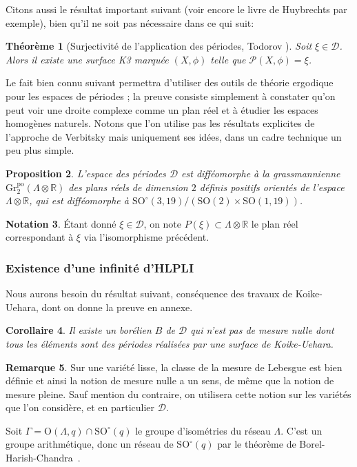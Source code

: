 \documentclass[JEP,XML,SOM,Unicode,francais,published]{cedram}
\newcommand{\R}{\mathbb{R}}
\newcommand{\rO}{\mathrm{O}}
\newcommand{\SO}{\mathrm{SO}}
\newtheorem{thm}{Théorème}
\newtheorem{coro}[thm]{Corollaire}
\newtheorem{prop}[thm]{Proposition}
\theoremstyle{definition}
\newtheorem{rem}[thm]{Remarque}
\newtheorem{notation}[thm]{Notation}
\begin{document}
Citons aussi le résultat important suivant (voir encore le livre de Huybrechts \hbox{\cite[chap.\,7]{huybrechts_2016}} par exemple), bien qu'il ne soit pas nécessaire dans ce qui suit:
\begin{thm}[Surjectivité de l'application des périodes, Todorov \cite{todorov}]\label{surjectivite-periode}
Soit $\xi \in \mathscr{D}$. Alors il existe une surface K3 marquée $(X, \phi)$ telle que $\mathscr{P}(X, \phi) = \xi$.
\end{thm}
Le fait bien connu suivant permettra d'utiliser des outils de théorie ergodique pour les espaces de périodes ; la preuve consiste simplement à constater qu'on peut voir une droite complexe comme un plan réel et à étudier les espaces homogènes naturels. Notons que l'on utilise pas les résultats explicites de l'approche de Verbitsky \cite{verbitsky2015ergodic} mais uniquement ses idées, dans un cadre technique un peu plus simple.
\begin{prop}\label{periodes-homogene}
L'espace des périodes $\mathscr{D}$ est difféomorphe à la grassmannienne $\mathrm{Gr}_2^{\mathrm{po}}(\Lambda\otimes\R)$ des plans réels de dimension $2$ définis positifs orientés de l'espace $\Lambda\otimes\R$, qui est difféomorphe à $\SO^\circ(3, 19)/(\SO(2) \times \SO(1, 19))$.
\end{prop}

\begin{notation}
Étant donné $\xi \in \mathscr{D}$, on note $P(\xi) \subset \Lambda \otimes \R$ le plan réel correspondant à $\xi$ via l'isomorphisme précédent.
\end{notation}

\subsubsection*{Existence d'une infinité d'HLPLI }
Nous aurons besoin du résultat suivant, conséquence des travaux de Koike-Uehara, dont on donne la preuve en annexe.
\begin{coro}
\label{thm-construction}
\label{coro-borelien}
Il existe un borélien $B$ de $\mathscr{D}$ qui n'est pas de mesure nulle dont tous les éléments sont des périodes réalisées par une surface de Koike-Uehara.
\end{coro}
\begin{rem}
Sur une variété lisse, la classe de la mesure de Lebesgue est bien définie et ainsi la notion de mesure nulle a un sens, de même que la notion de mesure pleine. Sauf mention du contraire, on utilisera cette notion sur les variétés que l'on considère, et en particulier $\mathscr{D}$.
\end{rem}
Soit $\Gamma = \rO(\Lambda, q) \cap \SO^\circ(q)$ le groupe d'isométries du réseau $\Lambda$. C'est un groupe arithmétique, donc un réseau de $\SO^\circ(q)$ par le théorème de Borel-Harish-Chandra~\cite{borelharishchandra}.
\end{document}
